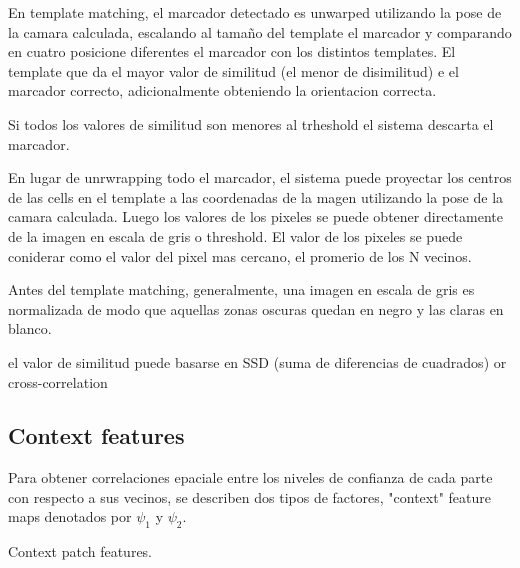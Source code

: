 \documentclass[runningheads]{llncs}
\begin{document}
En template matching, el marcador detectado es unwarped utilizando la pose de la camara calculada, escalando al tamaño del template el marcador y comparando en cuatro posicione diferentes el marcador con los distintos templates. El template que da el mayor valor de similitud (el menor de disimilitud) e el marcador correcto, adicionalmente obteniendo la orientacion correcta.

Si todos los valores de similitud son menores al trheshold el sistema descarta el marcador.

En lugar de unrwrapping todo el marcador, el sistema puede proyectar los centros de las cells en el template a las coordenadas de la magen utilizando la pose de la camara calculada. Luego los valores de los pixeles se puede obtener directamente de la imagen en escala de gris o threshold. El valor de los pixeles se puede coniderar como el valor del pixel mas cercano, el promerio de los N vecinos.


Antes del template matching, generalmente, una imagen en escala de gris es normalizada de modo que aquellas zonas oscuras quedan en negro y las claras en blanco.

el valor de similitud puede basarse en SSD (suma de diferencias de cuadrados) or cross-correlation

\subsection{Context features}
Para obtener correlaciones epaciale entre los niveles de confianza de cada parte con respecto a sus vecinos, se describen dos tipos de factores, "context" feature maps denotados por $\psi_1$ y $\psi_2$.

Context patch features. 

{}

\end{document}
